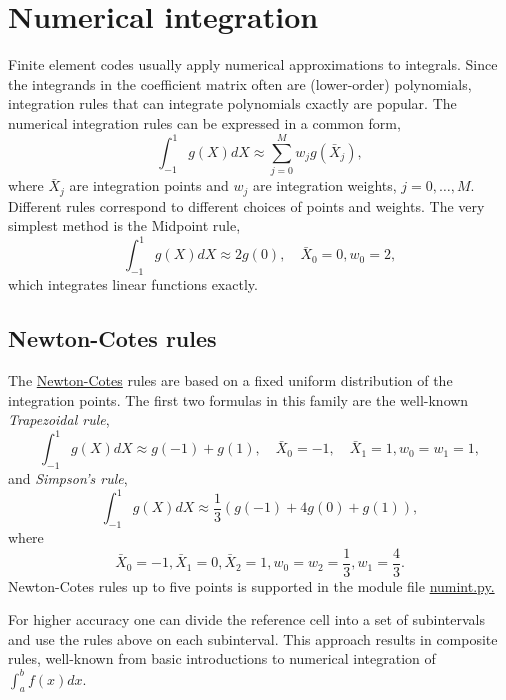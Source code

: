 \documentclass[../main.tex]{subfiles}
\begin{document}
\chapter{Numerical integration}
\label{chap:chap_7}
\noindent Finite element codes usually apply numerical approximations to integrals. Since the integrands in the coefficient matrix often are (lower-order) polynomials, integration rules that can integrate polynomials cxactly are popular.
The numerical integration rules can be expressed in a common form,
\begin{equation}\label{eqa99}
	\int_{-1}^{1} g(X) d X \approx \sum_{j=0}^{M} w_{j} g\left(\bar{X}_{j}\right),
\end{equation}	
where $\bar{X}_{j}$ are integration points and $w_{j}$ are integration weights, $j=0, \ldots, M$. Different rules correspond to different choices of points and weights.
The very simplest method is the Midpoint rule,
\begin{equation}\label{eqa100}
	\int_{-1}^{1} g(X) d X \approx 2 g(0), \quad \bar{X}_{0}=0, w_{0}=2,
\end{equation}	
which integrates linear functions exactly.
\section[Newton-Cotes rules]{Newton-Cotes rules}
\label{sec:sec_7_1}
\noindent The \href{https://en.wikipedia.org/wiki/Newton%E2%80%93Cotes_formulas}{Newton-Cotes} rules are based on a fixed uniform distribution of the integration points. The first two formulas in this family are the well-known \textit{Trapezoidal rule},
\begin{equation}\label{eqa101}
	\int_{-1}^{1} g(X) d X \approx g(-1)+g(1), \quad \bar{X}_{0}=-1, \quad \bar{X}_{1}=1, w_{0}=w_{1}=1,
\end{equation}
and \textit{Simpson's rule},
\begin{equation}\label{eqa102}
	\int_{-1}^{1} g(X) d X \approx \frac{1}{3}(g(-1)+4 g(0)+g(1)),
\end{equation}
where
\begin{equation}\label{eqa103}
	\bar{X}_{0}=-1, \bar{X}_{1}=0, \bar{X}_{2}=1, w_{0}=w_{2}=\frac{1}{3}, w_{1}=\frac{4}{3}.
\end{equation}
Newton-Cotes rules up to five points is supported in the module file \href{https://github.com/hplgit/INF5620/blob/master/src/fem/numint.py}{numint.py.}

For higher accuracy one can divide the reference cell into a set of subintervals and use the rules above on each subinterval. This approach results in composite rules, well-known from basic introductions to numerical integration of $\int_{a}^{b} f(x) d x$.
\bigbreak
\end{document}
